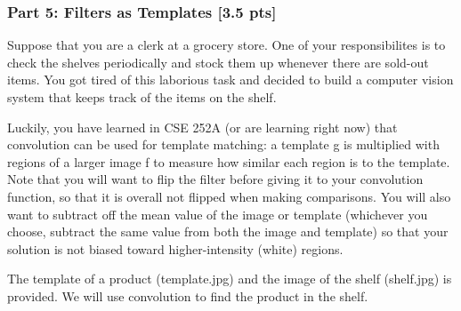 \documentclass[11pt]{article}
\begin{document}
    \hypertarget{part-5-filters-as-templates-3.5-pts}{%
\subsubsection{Part 5: Filters as Templates {[}3.5
pts{]}}\label{part-5-filters-as-templates-3.5-pts}}

    Suppose that you are a clerk at a grocery store. One of your
responsibilites is to check the shelves periodically and stock them up
whenever there are sold-out items. You got tired of this laborious task
and decided to build a computer vision system that keeps track of the
items on the shelf.

Luckily, you have learned in CSE 252A (or are learning right now) that
convolution can be used for template matching: a template g is
multiplied with regions of a larger image f to measure how similar each
region is to the template. Note that you will want to flip the filter
before giving it to your convolution function, so that it is overall not
flipped when making comparisons. You will also want to subtract off the
mean value of the image or template (whichever you choose, subtract the
same value from both the image and template) so that your solution is
not biased toward higher-intensity (white) regions.

The template of a product (template.jpg) and the image of the shelf
(shelf.jpg) is provided. We will use convolution to find the product in
the shelf.
\end{document}
